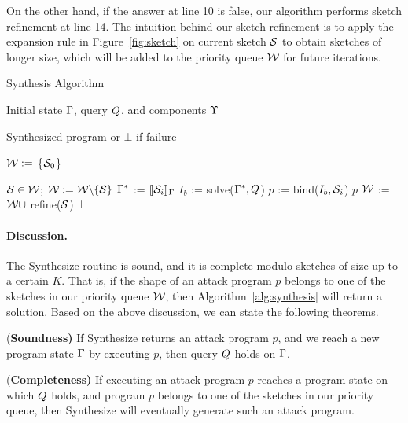 On the other hand, if the answer at line 10 is {\sc false}, our algorithm performs 
sketch refinement at line 14. The intuition behind our sketch refinement is to apply
the {\sc expansion} rule in Figure~\ref{fig:sketch} 
on current sketch $\mathcal{S}$ to obtain sketches of longer size, which will 
be added to the priority queue $\mathcal{W}$ for future iterations.
\begin{algorithm}[t]
\caption{Synthesis Algorithm}\label{alg:synthesis}
{%
\begin{algorithmic}[1]
 Initial state $\Gamma$, query $Q$,  and components $\Upsilon$

 Synthesized program or $\bot$ if failure
\vspace{0.05in}

\State  $\mathcal{W} :=$  \{$\mathcal{S}_0$\} 

\While {$\worklist \neq \emptyset$} 
     $\mathcal{S} \in \mathcal{W}$;     
    \State $\mathcal{W} := \mathcal{W} \backslash \{\mathcal{S}\}$ 
            \State $\Gamma^{*}$ := ${[\![\mathcal{S}_i]\!]_\Gamma}$ 
            \State $I_{b}$ := {\sc solve}($\Gamma^{*}, Q$) 
            	\State $p$ := {\sc bind}($I_{b}, \mathcal{S}_i$) 
                \State \Return $p$
            \EndIf
        \EndFor
    \State $\mathcal{W}$ := $\mathcal{W} \cup$ {\sc refine}($\mathcal{S}$) 
\EndWhile
\vspace{0.05in}
\State \Return $\bot$
\EndProcedure
\end{algorithmic}
}
\end{algorithm}
\paragraph{Discussion.}
The {\sc Synthesize} routine is sound, and it is complete modulo sketches of 
size up to a certain $K$. That is, if the shape of an attack program $p$ 
belongs to one of the sketches in our priority queue $\mathcal{W}$, 
then Algorithm~\ref{alg:synthesis} will return a solution.
Based on the above discussion, we can state the following theorems. 
\begin{theorem}{{(\bf Soundness)}}
If {\sc Synthesize} returns an attack program $p$, and we reach a new program state $\Gamma$
by executing $p$, then query $Q$ holds on $\Gamma$.
\end{theorem}
\begin{theorem}{{(\bf Completeness)}}
If executing an attack program $p$ reaches a program state on which $Q$ holds,
and program $p$ belongs to one of the sketches in our priority queue,
then {\sc Synthesize} will eventually generate such an attack program. 
\end{theorem}
